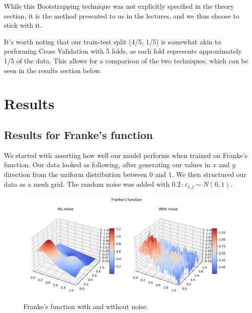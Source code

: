 \documentclass{article}
\begin{document}
While this Bootstrapping technique was not explicitly specified in the theory section, it is the method presented to us in the lectures, and we thus choose to stick with it. 

It's worth noting that our train-test split (4/5, 1/5) is somewhat akin to performing Cross Validation with 5 folds, as each fold represents approximately 1/5 of the data. This allows for a comparison of the two techniques, which can be seen in the results section below.

\newpage
\section{Results}
\subsection{Results for Franke's function}
We started with asserting how well our model performs when trained on Franke's function. Our data looked as following, after generating our values in $x$ and $y$ direction from the uniform distribution between $0$ and $1$. We then structured our data as a mesh grid. The random noise was added with $0.2 \cdot \varepsilon_{i,j} \sim N(0, 1)$.
\begin{figure}[htbp]
    \centering
    \includegraphics[width=\textwidth]{Franke/FrankesFunction.png}
    \caption{Franke's function with and without noise.}
    \label{fig:FrankeTerrain}
\end{figure}

\newpage
\end{document}
